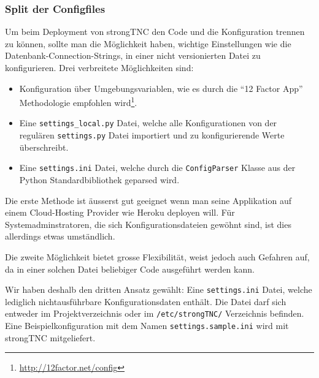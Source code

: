\subsubsection{Split der Configfiles}

Um beim Deployment von strongTNC den Code und die Konfiguration trennen zu
können, sollte man die Möglichkeit haben, wichtige Einstellungen wie die
Datenbank-Connection-Strings, in einer nicht versionierten Datei zu
konfigurieren. Drei verbreitete Möglichkeiten sind:

\begin{itemize}
	\item Konfiguration über Umgebungsvariablen, wie es durch die \enquote{12
		Factor App} Methodologie empfohlen
		wird\footnote{\url{http://12factor.net/config}}.
	\item Eine \texttt{settings\_local.py} Datei, welche alle Konfigurationen von
		der regulären \texttt{settings.py} Datei importiert und zu konfigurierende
		Werte überschreibt.
	\item Eine \texttt{settings.ini} Datei, welche durch die \texttt{ConfigParser}
		Klasse aus der Python Standardbibliothek geparsed wird.
\end{itemize}

Die erste Methode ist äusserst gut geeignet wenn man seine Applikation auf einem
Cloud-Hosting Provider wie Heroku deployen will. Für Systemadminstratoren, die
sich Konfigurationsdateien gewöhnt sind, ist dies allerdings etwas umständlich.

Die zweite Möglichkeit bietet grosse Flexibilität, weist jedoch auch Gefahren
auf, da in einer solchen Datei beliebiger Code ausgeführt werden kann.

Wir haben deshalb den dritten Ansatz gewählt: Eine \texttt{settings.ini} Datei,
welche lediglich nichtausführbare Konfigurationsdaten enthält. Die Datei darf
sich entweder im Projektverzeichnis oder im \texttt{/etc/strongTNC/} Verzeichnis
befinden. Eine Beispielkonfiguration mit dem Namen \texttt{settings.sample.ini}
wird mit strongTNC mitgeliefert.

